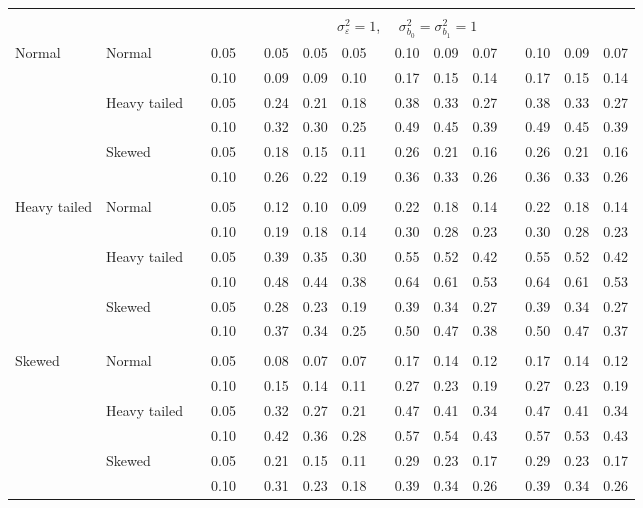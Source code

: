 \documentclass[11pt]{article} %
\begin{document}
\begin{table}[ht]
\begin{scriptsize}
\begin{center}
\begin{tabular}{ll p{.1cm} c p{.1cm} rrr p{.1cm} rrr p{.1cm} rrr}
&&&&&&&&&&&&&&&\\
& && && \multicolumn{9}{c}{$\sigma_{\varepsilon}^2 = 1$, \ \ $\sigma_{b_0}^2 = \sigma_{b_1}^2 = 1$} \\ \cline{6-16}
Normal       & Normal       && 0.05 &&  0.05 & 0.05 & 0.05 && 0.10 & 0.09 & 0.07 && 0.10 & 0.09 & 0.07 \\ 
             &              && 0.10 &&  0.09 & 0.09 & 0.10 && 0.17 & 0.15 & 0.14 && 0.17 & 0.15 & 0.14 \\ 
             & Heavy tailed && 0.05 &&  0.24 & 0.21 & 0.18 && 0.38 & 0.33 & 0.27 && 0.38 & 0.33 & 0.27 \\ 
             &              && 0.10 &&  0.32 & 0.30 & 0.25 && 0.49 & 0.45 & 0.39 && 0.49 & 0.45 & 0.39 \\ 
             & Skewed       && 0.05 &&  0.18 & 0.15 & 0.11 && 0.26 & 0.21 & 0.16 && 0.26 & 0.21 & 0.16 \\ 
             &              && 0.10 &&  0.26 & 0.22 & 0.19 && 0.36 & 0.33 & 0.26 && 0.36 & 0.33 & 0.26 \\ 
             &&&&&&&&&&&&&&&\\
Heavy tailed & Normal       && 0.05 &&  0.12 & 0.10 & 0.09 && 0.22 & 0.18 & 0.14 && 0.22 & 0.18 & 0.14 \\ 
             &              && 0.10 &&  0.19 & 0.18 & 0.14 && 0.30 & 0.28 & 0.23 && 0.30 & 0.28 & 0.23 \\ 
             & Heavy tailed && 0.05 &&  0.39 & 0.35 & 0.30 && 0.55 & 0.52 & 0.42 && 0.55 & 0.52 & 0.42 \\ 
             &              && 0.10 &&  0.48 & 0.44 & 0.38 && 0.64 & 0.61 & 0.53 && 0.64 & 0.61 & 0.53 \\ 
             & Skewed       && 0.05 &&  0.28 & 0.23 & 0.19 && 0.39 & 0.34 & 0.27 && 0.39 & 0.34 & 0.27 \\ 
             &              && 0.10 &&  0.37 & 0.34 & 0.25 && 0.50 & 0.47 & 0.38 && 0.50 & 0.47 & 0.37 \\ 
             &&&&&&&&&&&&&&&\\
Skewed       & Normal       && 0.05 &&  0.08 & 0.07 & 0.07 && 0.17 & 0.14 & 0.12 && 0.17 & 0.14 & 0.12 \\ 
             &              && 0.10 &&  0.15 & 0.14 & 0.11 && 0.27 & 0.23 & 0.19 && 0.27 & 0.23 & 0.19 \\ 
             & Heavy tailed && 0.05 &&  0.32 & 0.27 & 0.21 && 0.47 & 0.41 & 0.34 && 0.47 & 0.41 & 0.34 \\ 
             &              && 0.10 &&  0.42 & 0.36 & 0.28 && 0.57 & 0.54 & 0.43 && 0.57 & 0.53 & 0.43 \\ 
             & Skewed       && 0.05 &&  0.21 & 0.15 & 0.11 && 0.29 & 0.23 & 0.17 && 0.29 & 0.23 & 0.17 \\ 
             &              && 0.10 &&  0.31 & 0.23 & 0.18 && 0.39 & 0.34 & 0.26 && 0.39 & 0.34 & 0.26 \\ 
 


\end{tabular}
\end{center}
\end{scriptsize}
\end{table}
\end{document}
